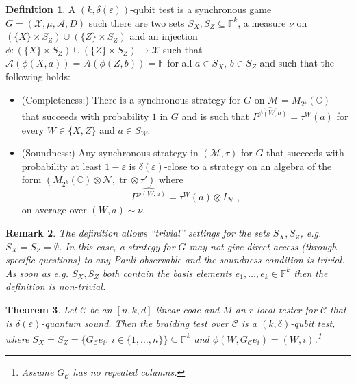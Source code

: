 \documentclass[11pt]{article}
\newtheorem{theorem}{Theorem}[section]
\newtheorem{remark}[theorem]{Remark}
\theoremstyle{definition}
\newtheorem{definition}[theorem]{Definition}
\newcommand{\code}{\mathcal{C}}
\newcommand{\Id}{\ensuremath{I}}
\newcommand{\field}{\mathbb{F}}
\newcommand{\C}{\ensuremath{\mathbb{C}}}
\newcommand{\mA}{\ensuremath{\mathcal{A}}}
\newcommand{\mM}{\ensuremath{\mathcal{M}}}
\newcommand{\mX}{\ensuremath{\mathcal{X}}}
\newcommand{\eps}{\varepsilon}
\newcommand{\mN}{\mathcal{N}}
\DeclareMathOperator{\tr}{tr}
\begin{document}
\begin{definition}
A $(k,\delta(\eps))$-qubit test is a synchronous game $G=(\mX,\mu,\mA,D)$ such there are two sets $S_X,S_Z\subseteq \field^k$, a measure $\nu$ on $(\{X\}\times S_Z) \cup (\{Z\}\times S_Z)$ and an injection $\phi:(\{X\}\times S_Z) \cup (\{Z\}\times S_Z) \to \mX$ such that $\mA(\phi({X},a))=\mA(\phi({Z},b))=\field$ for all $a\in S_X$, $b\in S_Z$ and such that the following holds:
\begin{itemize}
\item (Completeness:) There is a synchronous strategy for $G$ on $\mM=M_{2^{k}}(\C)$ that succeeds with probability $1$ in $G$ and is such that $\widehat{P^{\phi({W},a)}} = \tau^W(a)$ for every $W\in\{X,Z\}$ and $a\in S_W$.
\item (Soundness:) Any synchronous strategy in $(\mM,\tau)$ for $G$ that succeeds with probability at least $1-\eps$ is $\delta(\eps)$-close to a strategy on an algebra of the form $(M_{2^{k}}(\C)\otimes \mN,\tr\otimes \tau')$ where
\[\widehat{P^{\phi({W},a)}} = \tau^W(a)\otimes \Id_\mN\;,\]
on average over $(W,a)\sim \nu$. 
\end{itemize}
\end{definition}

\begin{remark}
The definition allows ``trivial'' settings for the sets $S_X,S_Z$, e.g.\ $S_X=S_Z=\emptyset$. In this case, a strategy for $G$ may not give direct access (through specific questions) to any Pauli observable and the soundness condition is trivial. As soon as e.g. $S_X,S_Z$ both contain the basis elements $e_1,\ldots,e_k \in \field^k$ then the definition is non-trivial. 
\end{remark}

\begin{theorem}
Let $\code$ be an $[n,k,d]$ linear code and $M$ an $r$-local tester for $\code$ that is $\delta(\eps)$-quantum sound. Then the braiding test over $\code$ is a $(k,\delta)$-qubit test, where $S_X=S_Z=\{G_\code e_i:\,i\in\{1,\ldots,n\}\}\subseteq \field^k$ and $\phi(W,G_\code e_i)=(W,i)$.\footnote{Assume $G_\code$ has no repeated columns.} 
\end{theorem}
\end{document}
